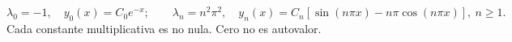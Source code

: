 \[\lambda_0=-1,\quad y_0(x)=C_0e^{-x};\qquad \lambda_n=n^2\pi^2,\quad y_n(x)=C_n[\sin(n\pi x)-n\pi\cos(n\pi x)],\ n\ge1.\]
Cada constante multiplicativa es no nula. Cero no es autovalor.
